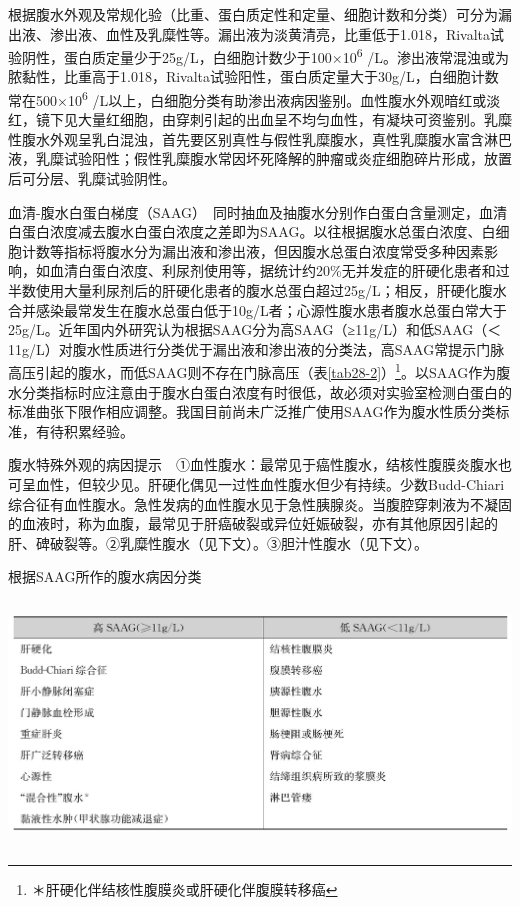 根据腹水外观及常规化验（比重、蛋白质定性和定量、细胞计数和分类）可分为漏出液、渗出液、血性及乳糜性等。漏出液为淡黄清亮，比重低于1.018，Rivalta试验阴性，蛋白质定量少于25g/L，白细胞计数少于100×10\textsuperscript{6}
/L。渗出液常混浊或为脓黏性，比重高于1.018，Rivalta试验阳性，蛋白质定量大于30g/L，白细胞计数常在500×10\textsuperscript{6}
/L以上，白细胞分类有助渗出液病因鉴别。血性腹水外观暗红或淡红，镜下见大量红细胞，由穿刺引起的出血呈不均匀血性，有凝块可资鉴别。乳糜性腹水外观呈乳白混浊，首先要区别真性与假性乳糜腹水，真性乳糜腹水富含淋巴液，乳糜试验阳性；假性乳糜腹水常因坏死降解的肿瘤或炎症细胞碎片形成，放置后可分层、乳糜试验阴性。

血清-腹水白蛋白梯度（SAAG）　同时抽血及抽腹水分别作白蛋白含量测定，血清白蛋白浓度减去腹水白蛋白浓度之差即为SAAG。以往根据腹水总蛋白浓度、白细胞计数等指标将腹水分为漏出液和渗出液，但因腹水总蛋白浓度常受多种因素影响，如血清白蛋白浓度、利尿剂使用等，据统计约20\%无并发症的肝硬化患者和过半数使用大量利尿剂后的肝硬化患者的腹水总蛋白超过25g/L；相反，肝硬化腹水合并感染最常发生在腹水总蛋白低于10g/L者；心源性腹水患者腹水总蛋白常大于25g/L。近年国内外研究认为根据SAAG分为高SAAG（≥11g/L）和低SAAG（＜11g/L）对腹水性质进行分类优于漏出液和渗出液的分类法，高SAAG常提示门脉高压引起的腹水，而低SAAG则不存在门脉高压（表\ref{tab28-2}）\footnote{＊肝硬化伴结核性腹膜炎或肝硬化伴腹膜转移癌}。以SAAG作为腹水分类指标时应注意由于腹水白蛋白浓度有时很低，故必须对实验室检测白蛋白的标准曲张下限作相应调整。我国目前尚未广泛推广使用SAAG作为腹水性质分类标准，有待积累经验。

腹水特殊外观的病因提示　①血性腹水：最常见于癌性腹水，结核性腹膜炎腹水也可呈血性，但较少见。肝硬化偶见一过性血性腹水但少有持续。少数Budd-Chiari综合征有血性腹水。急性发病的血性腹水见于急性胰腺炎。当腹腔穿刺液为不凝固的血液时，称为血腹，最常见于肝癌破裂或异位妊娠破裂，亦有其他原因引起的肝、碑破裂等。②乳糜性腹水（见下文）。③胆汁性腹水（见下文）。

\begin{table}[htbp]
\centering
\caption{根据SAAG所作的腹水病因分类}
\label{tab28-2}
\includegraphics[width=5.9375in,height=2.55208in]{./images/Image00153.jpg}
\end{table}


